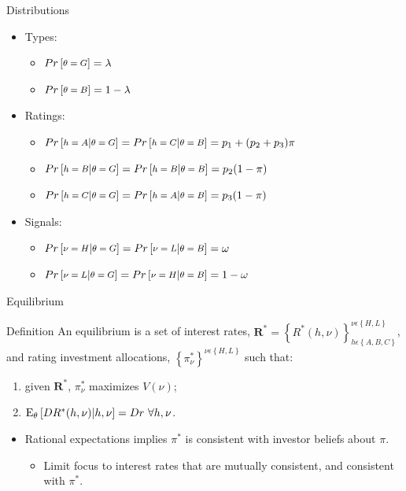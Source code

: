 \documentclass{beamer}
\begin{document}
\begin{frame}{Distributions}
\begin{itemize}
\item Types:
	\begin{itemize}
	\item $Pr\left [\medmath{\theta=G}\right]=\lambda$
	\item $Pr\left [\medmath{\theta=B}\right]=1-\lambda$
	\end{itemize}
\item Ratings:
	\begin{itemize}
	\item $Pr\left [\medmath{h=A}|\medmath{\theta=G}\right ]=Pr\left [\medmath{h=C}|\medmath{\theta=B}\right ]=p_{1}+(p_{2}+p_{3})\pi$
	\item $Pr\left [\medmath{h=B}|\medmath{\theta=G}\right ]=Pr\left [\medmath{h=B}|\medmath{\theta=B}\right ]=p_{2}(1-\pi)$
	\item $Pr\left [\medmath{h=C}|\medmath{\theta=G}\right ]=Pr\left [\medmath{h=A}|\medmath{\theta=B}\right ]=p_{3}(1-\pi)$
	\end{itemize}
\item Signals:
	\begin{itemize}
	\item $Pr\left [\medmath{\nu=H}|\medmath{\theta=G}\right ]=Pr\left [\medmath{\nu=L}|\medmath{\theta=B}\right ]=\omega$
	\item $Pr\left [\medmath{\nu=L}|\medmath{\theta=G}\right ]=Pr\left [\medmath{\nu=H}|\medmath{\theta=B}\right ]=1-\omega$
	\end{itemize}
\end{itemize}
\end{frame}

\begin{frame}{Equilibrium}
\begin{block}{Definition}
An equilibrium is a set of interest rates, $\mathbf{R}^{*}=\left\{ R^{*}\left (h,\nu\right )\right\}_{h\epsilon\left\{A,B,C\right\}}^{\nu\epsilon\left\{H,L\right\}}$, and rating investment allocations, $\left\{\pi^{*}_{\nu}\right\}^{\nu\epsilon\left\{H,L\right\}}$ such that:
\begin{enumerate}
	\setlength{\itemindent}{0.8cm}
	\item given $\mathbf{R}^{*}$, $\pi^{*}_{\nu}$ maximizes $V(\nu)$;
	\item $\textup{E}_{\theta} \left [DR^{*}(h,\nu)|h,\nu \right ] = Dr \,\, \forall h, \nu$.
\end{enumerate}
\end{block}
\begin{itemize}
	\item Rational expectations implies $\pi^{*}$ is consistent with investor beliefs about $\pi$.
	\begin{itemize}
		\item Limit focus to interest rates that are mutually consistent, and consistent with $\pi^{*}$.
	\end{itemize}
\end{itemize}
\end{frame}
\end{document}
